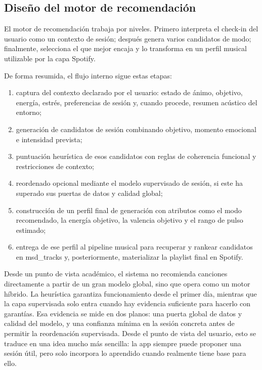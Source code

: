 \subsection{Diseño del motor de recomendación}

El motor de recomendación trabaja por niveles. Primero interpreta el check-in
del usuario como un contexto de sesión; después genera varios candidatos de
modo; finalmente, selecciona el que mejor encaja y lo transforma en un perfil
musical utilizable por la capa Spotify.

De forma resumida, el flujo interno sigue estas etapas:

\begin{enumerate}
    \item captura del contexto declarado por el usuario: estado de ánimo, objetivo, energía, estrés, preferencias de sesión y, cuando procede, resumen acústico del entorno;
    \item generación de candidatos de sesión combinando objetivo, momento emocional e intensidad prevista;
    \item puntuación heurística de esos candidatos con reglas de coherencia funcional y restricciones de contexto;
    \item reordenado opcional mediante el modelo supervisado de sesión, si este ha superado sus puertas de datos y calidad global;
    \item construcción de un perfil final de generación con atributos como el modo recomendado, la energía objetivo, la valencia objetivo y el rango de pulso estimado;
    \item entrega de ese perfil al pipeline musical para recuperar y rankear candidatos en msd\_tracks y, posteriormente, materializar la playlist final en Spotify.
\end{enumerate}

Desde un punto de vista académico, el sistema no recomienda canciones
directamente a partir de un gran modelo global, sino que opera como un motor
híbrido. La heurística garantiza funcionamiento desde el primer día, mientras
que la capa supervisada solo entra cuando hay evidencia suficiente para hacerlo
con garantías. Esa evidencia se mide en dos planos: una puerta global de datos
y calidad del modelo, y una confianza mínima en la sesión concreta antes de
permitir la reordenación supervisada.
Desde el punto de vista del usuario, esto se traduce en una idea mucho más
sencilla: la app siempre puede proponer una sesión útil, pero solo incorpora lo
aprendido cuando realmente tiene base para ello.

